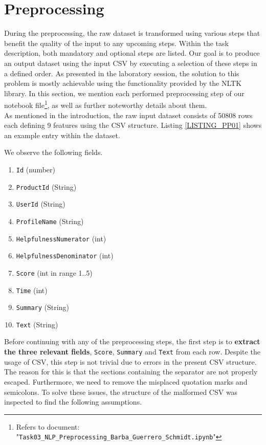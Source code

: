 \section{Preprocessing}
During the preprocessing, the raw dataset is transformed using various steps that benefit the quality of the input to any upcoming steps. Within the task description, both mandatory and optional steps are listed. Our goal is to produce an output dataset using the input CSV by executing a selection of these steps in a defined order. As presented in the laboratory session, the solution to this problem is mostly achievable using the functionality provided by the NLTK library. In this section, we mention each performed preprocessing step of our notebook file\footnote{Refers to document: "\texttt{Task03\_NLP\_Preprocessing\_Barba\_Guerrero\_Schmidt.ipynb}"}, as well as further noteworthy details about them.\\

As mentioned in the introduction, the raw input dataset consists of 50808 rows each defining 9 features using the CSV structure. Listing \ref{LISTING_PP01} shows an example entry within the dataset. 


\hspace{1em}

\noindent
We observe the following fields.

\begin{enumerate}
    \item \texttt{Id} (number)
    \item \texttt{ProductId} (String)
    \item \texttt{UserId} (String)
    \item \texttt{ProfileName} (String)
    \item \texttt{HelpfulnessNumerator} (int)
    \item \texttt{HelpfulnessDenominator} (int)
    \item \texttt{Score} (int in range 1..5)
    \item \texttt{Time} (int)
    \item \texttt{Summary} (String)
    \item \texttt{Text} (String)
\end{enumerate}


Before continuing with any of the preprocessing steps, the first step is to \textbf{extract the three relevant fields}, \texttt{Score}, \texttt{Summary} and \texttt{Text} from each row. Despite the usage of CSV, this step is not trivial due to errors in the present CSV structure. The reason for this is that the sections containing the separator are not properly escaped. Furthermore, we need to remove the misplaced quotation marks and semicolons. To solve these issues, the structure of the malformed CSV was inspected to find the following assumptions.

